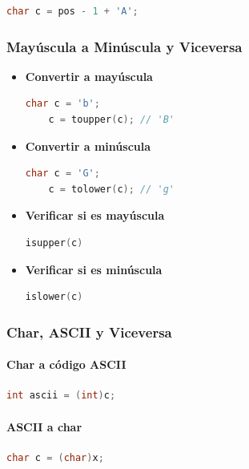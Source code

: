 \begin{lstlisting}[language=C++]
	char c = pos - 1 + 'A';
\end{lstlisting}

\subsubsection{Mayúscula a Minúscula y Viceversa}

\begin{itemize}
	\item \textbf{Convertir a mayúscula}
\begin{lstlisting}[language=C++]
	char c = 'b';
	c = toupper(c); // 'B'
\end{lstlisting}

	\item \textbf{Convertir a minúscula}
\begin{lstlisting}[language=C++]
	char c = 'G';
	c = tolower(c); // 'g'
\end{lstlisting}

	\item \textbf{Verificar si es mayúscula}
\begin{lstlisting}[language=C++]
	isupper(c)
\end{lstlisting}

	\item \textbf{Verificar si es minúscula}
\begin{lstlisting}[language=C++]
	islower(c)
\end{lstlisting}
\end{itemize}

\subsubsection{Char, ASCII y Viceversa}

\paragraph{Char a código ASCII}

\begin{lstlisting}[language=C++]
	int ascii = (int)c;
\end{lstlisting}

\paragraph{ASCII a char}

\begin{lstlisting}[language=C++]
	char c = (char)x;
\end{lstlisting}

